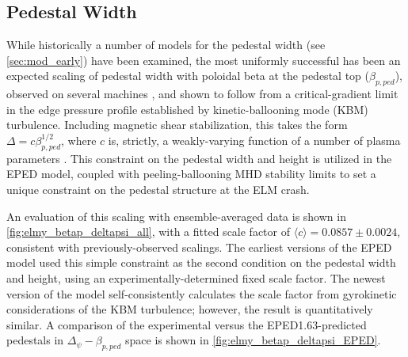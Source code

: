 \subsection{Pedestal Width}\label{subsec:elmy_eped_width}

While historically a number of models for the pedestal width (see \cref{sec:mod_early}) have been examined, the most uniformly successful has been an expected scaling of pedestal width with poloidal beta at the pedestal top ($\beta_{p,ped}$), observed on several machines \cite{Groebner2013}, and shown to follow from a critical-gradient limit in the edge pressure profile established by kinetic-ballooning mode (KBM) turbulence.  Including magnetic shear stabilization, this takes the form $\Delta = c \beta_{p,ped}^{1/2}$, where $c$ is, strictly, a weakly-varying function of a number of plasma parameters \cite{Snyder2009}.  This constraint on the pedestal width and height is utilized in the EPED model, coupled with peeling-ballooning MHD stability limits to set a unique constraint on the pedestal structure at the ELM crash.

An evaluation of this scaling with ensemble-averaged data is shown in \cref{fig:elmy_betap_deltapsi_all}, with a fitted scale factor of $\langle c \rangle = 0.0857 \pm 0.0024$, consistent with previously-observed scalings.  The earliest versions of the EPED model used this simple constraint as the second condition on the pedestal width and height, using an experimentally-determined fixed scale factor.  The newest version of the model self-consistently calculates the scale factor from gyrokinetic considerations of the KBM turbulence; however, the result is quantitatively similar.  A comparison of the experimental versus the EPED1.63-predicted pedestals in $\Delta_\psi - \beta_{p,ped}$ space is shown in \cref{fig:elmy_betap_deltapsi_EPED}.

\begin{figure}[ht]
 \pushtooutside
\end{figure}

